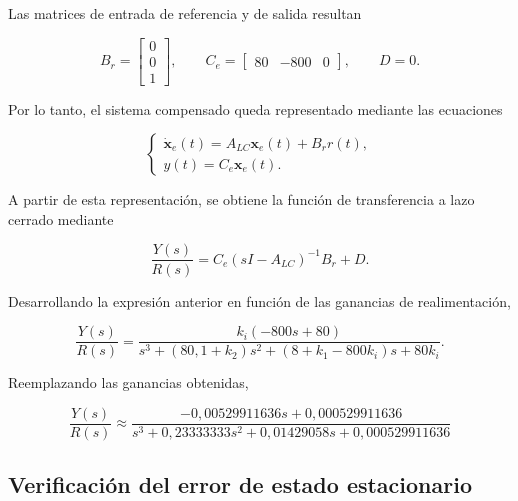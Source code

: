 \documentclass[10pt]{article}
\begin{document}
Las matrices de entrada de referencia y de salida
resultan

\begin{equation}
    B_r=
    \begin{bmatrix}
        0\\
        0\\
        1
    \end{bmatrix},
    \qquad
    C_e=
    \begin{bmatrix}
        80 & -800 & 0
    \end{bmatrix},
    \qquad D=0.
\end{equation}

Por lo tanto, el sistema compensado queda representado
mediante las ecuaciones

\begin{equation}
    \begin{cases}
        \dot{\mathbf{x}}_e(t)=
        A_{LC}\mathbf{x}_e(t)+B_rr(t),\\
        y(t)=C_e\mathbf{x}_e(t).
    \end{cases}
\end{equation}

A partir de esta representación, se obtiene la función
de transferencia a lazo cerrado mediante

\begin{equation}
    \frac{Y(s)}{R(s)}=
    C_e(sI-A_{LC})^{-1}B_r+D.
\end{equation}

Desarrollando la expresión anterior en función de
las ganancias de realimentación,

\begin{equation}
    \frac{Y(s)}{R(s)}=
    \frac{k_i(-800s+80)}
    {s^3+(80{,}1+k_2)s^2+
    (8+k_1-800k_i)s+80k_i}.
    \label{eq:ej10_transferencia_general}
\end{equation}

Reemplazando las ganancias obtenidas,

\begin{equation}
    \boxed{
        \frac{Y(s)}{R(s)}\approx
        \frac{-0{,}00529911636s+0{,}000529911636}
        {s^3+0{,}23333333s^2+
        0{,}01429058s+0{,}000529911636}
    }
    \label{eq:ej10_transferencia}
\end{equation}


\subsection{Verificación del error de estado estacionario}
\end{document}
